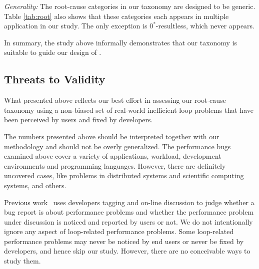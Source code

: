 \textit{Generality:}
The root-cause categories in our taxonomy are designed to be 
generic. Table \ref{tab:root} also shows that these categories 
each appears in multiple
application in our study. The only exception is $0^*$-resultless, which
never appears. 


In summary, the study above informally demonstrates that our taxonomy
is suitable to guide our design of \Tool.
%

\subsection{Threats to Validity} 
What presented above reflects our best effort in assessing our root-cause
taxonomy using a non-biased set of real-world inefficient loop problems that
have been perceived by users and fixed by developers.

The numbers presented above should be interpreted together with our methodology
and should not be overly generalized.
The performance bugs examined above cover a variety of applications, workload, 
development environments and programming languages. 
However, there are definitely uncovered cases, like problems in distributed systems
and scientific computing systems, and others. 

Previous work~\cite{PerfBug, SongOOPSLA2014} uses developers tagging and
on-line discussion to judge whether a bug report is about
performance problems and whether 
the performance problem under discussion is noticed and reported by users
or not.
We do not intentionally ignore any aspect of loop-related performance problems. 
Some loop-related performance problems may never be noticed by end users
or never be fixed by developers, and hence skip our study. However,
there are no conceivable ways to study them. 

